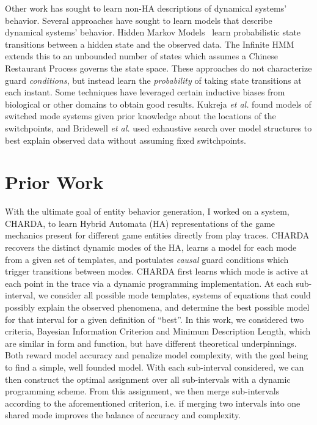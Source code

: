 \documentclass[12pt]{report}
\begin{document}
Other work has sought to learn non-HA descriptions of dynamical systems' behavior. 
Several approaches have sought to learn models that describe dynamical systems' behavior.
Hidden Markov Models~\cite{baum1966statistical} learn probabilistic state transitions between a hidden state and the observed data.
The Infinite HMM ~\cite{beal2002infinite} extends this to an unbounded number of states which assumes a Chinese Restaurant Process governs the state space.
These approaches do not characterize guard \textit{conditions}, but instead learn the \textit{probability} of taking state transitions at each instant. 
Some techniques have leveraged certain inductive biases from biological or other domains to obtain good results.
Kukreja \textit{et al.}\cite{kukreja2005least} found models of switched mode systems given prior knowledge about the locations of the switchpoints, and Bridewell \textit{et al.}\cite{bridewell2008inductive} used exhaustive search over model structures to best explain observed data without assuming fixed switchpoints.

\section*{Prior Work}


With the ultimate goal of entity behavior generation, I worked on a system, CHARDA, to learn Hybrid Automata (HA) representations of the game mechanics present for different game entities directly from play traces.   CHARDA recovers the distinct dynamic modes of the HA, learns a model for each mode from a given set of templates, and postulates \textit{causal} guard conditions which trigger transitions between modes. CHARDA first learns which mode is active at each point in the trace via a dynamic programming implementation.  At each sub-interval, we consider all possible mode templates, systems of equations that could possibly explain the observed phenomena, and determine the best possible model for that interval for a given definition of ``best''.  In this work, we considered two criteria, Bayesian Information Criterion and Minimum Description Length, which are similar in form and function, but have different theoretical underpinnings.  Both reward model accuracy and penalize model complexity, with the goal being to find a simple, well founded model.  With each sub-interval considered, we can then construct the optimal assignment over all sub-intervals with a dynamic programming scheme.  From this assignment, we then merge sub-intervals according to the aforementioned criterion, i.e. if merging two intervals into one shared mode improves the balance of accuracy and complexity. 
\end{document}
